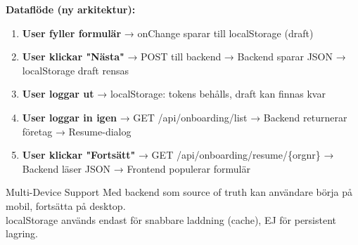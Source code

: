 \documentclass[10pt]{beamer}
\begin{document}
\begin{frame}[label=localstorage-strategy]
  \textbf{Dataflöde (ny arkitektur):}\\
  \begin{enumerate}
    \tiny
    \item \textbf{User fyller formulär} → onChange sparar till localStorage (draft)
    \item \textbf{User klickar "Nästa"} → POST till backend → Backend sparar JSON → localStorage draft rensas
    \item \textbf{User loggar ut} → localStorage: tokens behålls, draft kan finnas kvar
    \item \textbf{User loggar in igen} → GET /api/onboarding/list → Backend returnerar företag → Resume-dialog
    \item \textbf{User klickar "Fortsätt"} → GET /api/onboarding/resume/\{orgnr\} → Backend läser JSON → Frontend populerar formulär
  \end{enumerate}

  \vspace{0.3cm}

  \begin{block}{Multi-Device Support}
    \tiny Med backend som source of truth kan användare börja på mobil, fortsätta på desktop.\\
    localStorage används endast för snabbare laddning (cache), EJ för persistent lagring.
  \end{block}
\end{frame}
\end{document}
